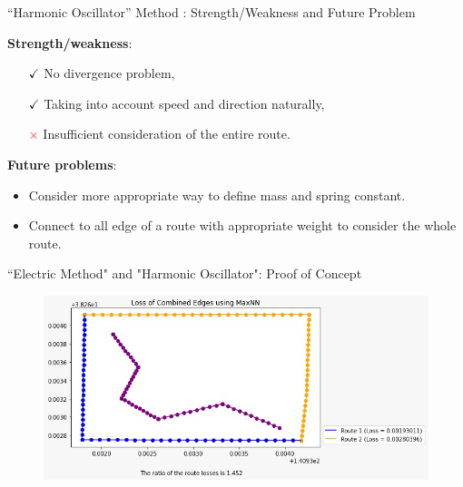 \documentclass[aspectratio=169, bigfiles]{beamer}
\def\red(#1){\textcolor{red}{#1}}
\begin{document}
\begin{frame}{``Harmonic Oscillator'' Method : Strength/Weakness and Future Problem}
    \begin{tcolorbox}[colframe=yellow,
    colback=yellow!10!white,
    colbacktitle=yellow!40!white,
    coltitle=black, fonttitle=\bfseries]
    \textbf{Strength/weakness}:
    \begin{itemize}
        \item[$\checkmark$]
        No divergence problem,
        \item[$\checkmark$]
        Taking into account speed and direction naturally,
        \item[\red($\times$)]
        Insufficient consideration of the entire route.
    \end{itemize}
    
    \textbf{Future problems}: 
    \begin{itemize}
        \item
        Consider more appropriate way to define mass and spring constant.
        \item
        Connect to all edge of a route with appropriate weight to consider the whole route.
    \end{itemize}
\end{tcolorbox}
\end{frame}

\begin{frame}{``Electric Method" and "Harmonic Oscillator": Proof of Concept}
    \begin{figure}
        \raggedleft
\includegraphics[scale=.55]{MaxNN.jpeg}
        \label{Electrical Method with Maximum Nearest Neighbor}
    \end{figure}
\end{frame}

\end{document}
